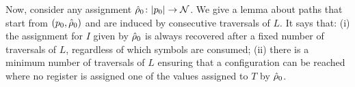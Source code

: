 %
Now, consider any assignment $\hat{\rho}_0 \colon |p_0| \to \mathcal{N}$. We give a lemma about paths that start from $(p_0,\hat{\rho}_0)$ and are induced by consecutive traversals of $L$.
It says that: (i) the assignment for $I$ given by $\hat{\rho}_0$ is always recovered after a fixed number of traversals of $L$, regardless of which symbols are consumed;
(ii) there is a minimum number of traversals of $L$ ensuring that a configuration can be reached where no register is assigned one of the values assigned to $T$ by $\hat{\rho}_0$.






%

